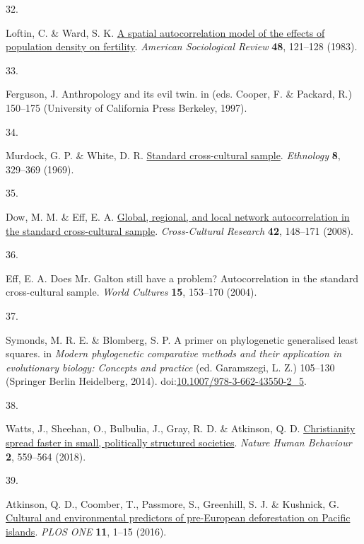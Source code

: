 \documentclass[
  man,floatsintext]{apa6}
\newlength{\cslhangindent}
\newlength{\csllabelwidth}
\newlength{\cslentryspacingunit} %
\newenvironment{CSLReferences}[2] %
 {%
  \setlength{\parindent}{0pt}
  \ifodd #1
  \let\oldpar\par
  \def\par{\hangindent=\cslhangindent\oldpar}
  \fi
  \setlength{\parskip}{#2\cslentryspacingunit}
 }%
 {}
\newcommand{\CSLLeftMargin}[1]{\parbox[t]{\csllabelwidth}{#1}}
\newcommand{\CSLRightInline}[1]{\parbox[t]{\linewidth - \csllabelwidth}{#1}\break}
\begin{document}
\begin{CSLReferences}{0}{0}
\leavevmode{}%
\CSLLeftMargin{32. }%
\CSLRightInline{Loftin, C. \& Ward, S. K. \href{https://doi.org/10.2307/2095150}{A spatial autocorrelation model of the effects of population density on fertility}. \emph{American Sociological Review} \textbf{48}, 121--128 (1983).}

\leavevmode{}%
\CSLLeftMargin{33. }%
\CSLRightInline{Ferguson, J. Anthropology and its evil twin. in (eds. Cooper, F. \& Packard, R.) 150--175 (University of California Press Berkeley, 1997).}

\leavevmode{}%
\CSLLeftMargin{34. }%
\CSLRightInline{Murdock, G. P. \& White, D. R. \href{https://doi.org/10.2307/3772907}{Standard cross-cultural sample}. \emph{Ethnology} \textbf{8}, 329--369 (1969).}

\leavevmode{}%
\CSLLeftMargin{35. }%
\CSLRightInline{Dow, M. M. \& Eff, E. A. \href{https://doi.org/10.1177/1069397107311186}{Global, regional, and local network autocorrelation in the standard cross-cultural sample}. \emph{Cross-Cultural Research} \textbf{42}, 148--171 (2008).}

\leavevmode{}%
\CSLLeftMargin{36. }%
\CSLRightInline{Eff, E. A. Does {M}r. {G}alton still have a problem? Autocorrelation in the standard cross-cultural sample. \emph{World Cultures} \textbf{15}, 153--170 (2004).}

\leavevmode{}%
\CSLLeftMargin{37. }%
\CSLRightInline{Symonds, M. R. E. \& Blomberg, S. P. A primer on phylogenetic generalised least squares. in \emph{Modern phylogenetic comparative methods and their application in evolutionary biology: Concepts and practice} (ed. Garamszegi, L. Z.) 105--130 (Springer Berlin Heidelberg, 2014). doi:\href{https://doi.org/10.1007/978-3-662-43550-2_5}{10.1007/978-3-662-43550-2\_5}.}

\leavevmode{}%
\CSLLeftMargin{38. }%
\CSLRightInline{Watts, J., Sheehan, O., Bulbulia, J., Gray, R. D. \& Atkinson, Q. D. \href{https://doi.org/10.1038/s41562-018-0379-3}{Christianity spread faster in small, politically structured societies}. \emph{Nature Human Behaviour} \textbf{2}, 559--564 (2018).}

\leavevmode{}%
\CSLLeftMargin{39. }%
\CSLRightInline{Atkinson, Q. D., Coomber, T., Passmore, S., Greenhill, S. J. \& Kushnick, G. \href{https://doi.org/10.1371/journal.pone.0156340}{Cultural and environmental predictors of pre-{European} deforestation on {Pacific} islands}. \emph{PLOS ONE} \textbf{11}, 1--15 (2016).}


\end{CSLReferences}
\end{document}
